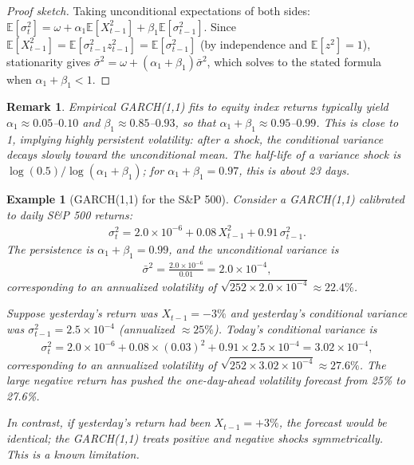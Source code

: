 \documentclass{report}
\theoremstyle{spacedplain}
\theoremstyle{spaceddefinition}
\newtheorem{example}[theorem]{Example}
\theoremstyle{spacedremark}
\newtheorem{remark}[theorem]{Remark}
\begin{document}
\begin{proof}[Proof sketch]
Taking unconditional expectations of both sides: $\mathbb{E}[\sigma_t^2] = \omega + \alpha_1 \mathbb{E}[X_{t-1}^2] + \beta_1 \mathbb{E}[\sigma_{t-1}^2]$. Since $\mathbb{E}[X_{t-1}^2] = \mathbb{E}[\sigma_{t-1}^2 z_{t-1}^2] = \mathbb{E}[\sigma_{t-1}^2]$ (by independence and $\mathbb{E}[z^2]=1$), stationarity gives $\bar{\sigma}^2 = \omega + (\alpha_1 + \beta_1)\bar{\sigma}^2$, which solves to the stated formula when $\alpha_1 + \beta_1 < 1$.
\end{proof}

\begin{remark}
Empirical GARCH(1,1) fits to equity index returns typically yield $\alpha_1 \approx 0.05$--$0.10$ and $\beta_1 \approx 0.85$--$0.93$, so that $\alpha_1 + \beta_1 \approx 0.95$--$0.99$. This is close to 1, implying highly persistent volatility: after a shock, the conditional variance decays slowly toward the unconditional mean. The half-life of a variance shock is $\log(0.5)/\log(\alpha_1 + \beta_1)$; for $\alpha_1 + \beta_1 = 0.97$, this is about 23 days.
\end{remark}

\begin{example}[GARCH(1,1) for the S\&P 500]
Consider a GARCH(1,1) calibrated to daily S\&P 500 returns:
\begin{align}
    \sigma_t^2 = 2.0 \times 10^{-6} + 0.08\, X_{t-1}^2 + 0.91\, \sigma_{t-1}^2.
\end{align}
The persistence is $\alpha_1 + \beta_1 = 0.99$, and the unconditional variance is
\begin{align}
    \bar{\sigma}^2 = \frac{2.0 \times 10^{-6}}{0.01} = 2.0 \times 10^{-4},
\end{align}
corresponding to an annualized volatility of $\sqrt{252 \times 2.0 \times 10^{-4}} \approx 22.4\%$.

Suppose yesterday's return was $X_{t-1} = -3\%$ and yesterday's conditional variance was $\sigma_{t-1}^2 = 2.5 \times 10^{-4}$ (annualized $\approx 25\%$). Today's conditional variance is
\begin{align}
    \sigma_t^2 = 2.0 \times 10^{-6} + 0.08 \times (0.03)^2 + 0.91 \times 2.5 \times 10^{-4} = 3.02 \times 10^{-4},
\end{align}
corresponding to an annualized volatility of $\sqrt{252 \times 3.02 \times 10^{-4}} \approx 27.6\%$. The large negative return has pushed the one-day-ahead volatility forecast from 25\% to 27.6\%.

In contrast, if yesterday's return had been $X_{t-1} = +3\%$, the forecast would be identical; the GARCH(1,1) treats positive and negative shocks symmetrically. This is a known limitation.
\end{example}
\end{document}
